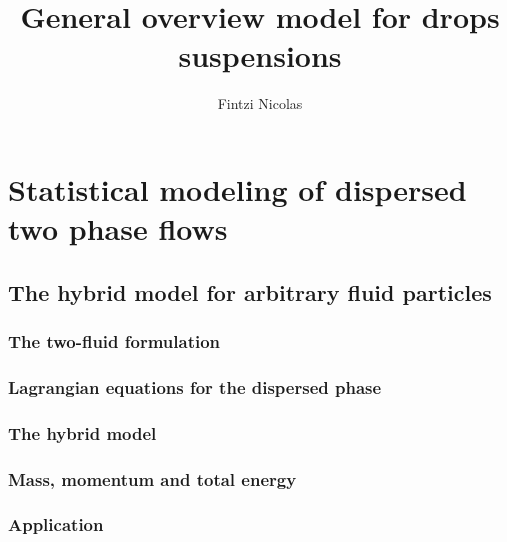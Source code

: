 \documentclass[12pt,a4paper,openany]{My_book}
\title{General overview model for drops suspensions}
\author{Fintzi Nicolas}
\begin{document}
\printnomenclature

\frontmatter





\mainmatter

\part{Statistical modeling of dispersed two phase flows}

\chapter{The hybrid model for arbitrary fluid particles}
\localtableofcontents



\section{The two-fluid formulation}
\label{sec:two-fluid}



\section{Lagrangian equations for the dispersed phase}
\label{sec:Lagrangian}



\section{The hybrid model}
\label{sec:averaged_eq}


% 

\section{Mass, momentum and total energy}
\label{ap:hypothesis}







\section{Application}
\label{sec:application}


\end{document}
